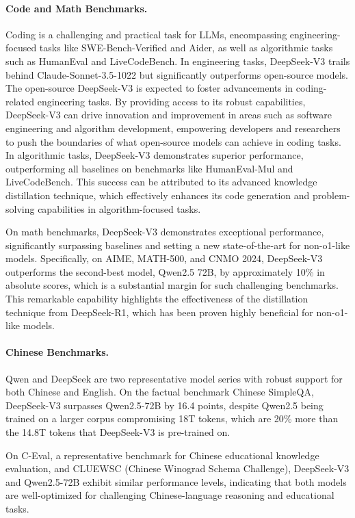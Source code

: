 \documentclass[11pt, a4paper, logo, copyright, nonumbering]{deepseek}
\newcommand{\dsviii}{DeepSeek-V3}
\begin{document}
\begin{CJK*}{UTF8}{gbsn}
\paragraph{Code and Math Benchmarks.}
Coding is a challenging and practical task for LLMs, encompassing engineering-focused tasks like SWE-Bench-Verified and Aider, as well as algorithmic tasks such as HumanEval and LiveCodeBench. 
In engineering tasks, \dsviii{} trails behind Claude-Sonnet-3.5-1022 but significantly outperforms open-source models. 
The open-source \dsviii{} is expected to foster advancements in coding-related engineering tasks. 
By providing access to its robust capabilities, \dsviii{} can drive innovation and improvement in areas such as software engineering and algorithm development, empowering developers and researchers to push the boundaries of what open-source models can achieve in coding tasks. 
In algorithmic tasks, \dsviii{} demonstrates superior performance, outperforming all baselines on benchmarks like HumanEval-Mul and LiveCodeBench. 
This success can be attributed to its advanced knowledge distillation technique, which effectively enhances its code generation and problem-solving capabilities in algorithm-focused tasks.

On math benchmarks, \dsviii{} demonstrates exceptional performance, significantly surpassing baselines and setting a new state-of-the-art for non-o1-like models. 
Specifically, on AIME, MATH-500, and CNMO 2024, \dsviii{} outperforms the second-best model, Qwen2.5 72B, by approximately 10\% in absolute scores, which is a substantial margin for such challenging benchmarks.
This remarkable capability highlights the effectiveness of the distillation technique from DeepSeek-R1, which has been proven highly beneficial for non-o1-like models.

\paragraph{Chinese Benchmarks.}
Qwen and DeepSeek are two representative model series with robust support for both Chinese and English. 
On the factual benchmark Chinese SimpleQA, \dsviii{} surpasses Qwen2.5-72B by 16.4 points, despite Qwen2.5 being trained on a larger corpus compromising 18T tokens, which are 20\% more than the 14.8T tokens that \dsviii{} is pre-trained on.

On C-Eval, a representative benchmark for Chinese educational knowledge evaluation, and CLUEWSC (Chinese Winograd Schema Challenge), \dsviii{} and Qwen2.5-72B exhibit similar performance levels, indicating that both models are well-optimized for challenging Chinese-language reasoning and educational tasks.


\end{CJK*}
\end{document}
